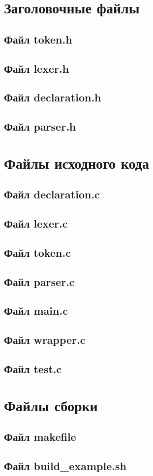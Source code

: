 \newcommand{\CRTfile}[1]{
  \subsection{Файл #1}
  \def\crttempmacroparameter{./ppp-compiler/src/#1}
  
}

\newcommand{\CRTfileexample}[2]{
  \subsection{#2 #1}
  \def\crttempmacroparameter{./ppp-compiler/example/#1}
  
}

\newcommand{\CRTfiletest}[2]{
  \subsection{#2 #1}
  \def\crttempmacroparameter{./ppp-compiler/test inputs/#1}
  
}

\section{Заголовочные файлы}
\CRTfile{token.h}
\CRTfile{lexer.h}
\CRTfile{declaration.h}
\CRTfile{parser.h}

\section{Файлы исходного кода}
\CRTfile{declaration.c}
\CRTfile{lexer.c}
\CRTfile{token.c}
\CRTfile{parser.c}
\CRTfile{main.c}
\CRTfile{wrapper.c}
\CRTfile{test.c}

\section{Файлы сборки}
\subsection{Файл makefile}


\subsection{Файл build\_example.sh}



